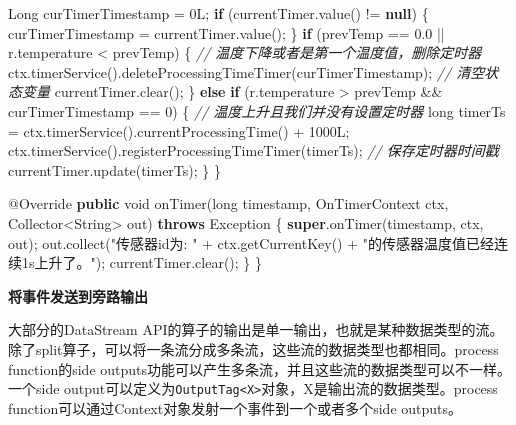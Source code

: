 \documentclass[cn,11pt,chinese]{elegantbook}
\newenvironment{Shaded}{}{}
\newcommand{\AttributeTok}[1]{\textcolor[rgb]{0.49,0.56,0.16}{#1}}
\newcommand{\BuiltInTok}[1]{#1}
\newcommand{\CommentTok}[1]{\textcolor[rgb]{0.38,0.63,0.69}{\textit{#1}}}
\newcommand{\DataTypeTok}[1]{\textcolor[rgb]{0.56,0.13,0.00}{#1}}
\newcommand{\DecValTok}[1]{\textcolor[rgb]{0.25,0.63,0.44}{#1}}
\newcommand{\FloatTok}[1]{\textcolor[rgb]{0.25,0.63,0.44}{#1}}
\newcommand{\FunctionTok}[1]{\textcolor[rgb]{0.02,0.16,0.49}{#1}}
\newcommand{\KeywordTok}[1]{\textcolor[rgb]{0.00,0.44,0.13}{\textbf{#1}}}
\newcommand{\NormalTok}[1]{#1}
\newcommand{\StringTok}[1]{\textcolor[rgb]{0.25,0.44,0.63}{#1}}
\begin{document}
\begin{Shaded}
\begin{Highlighting}[]
        \BuiltInTok{Long}\NormalTok{ curTimerTimestamp = }\DecValTok{0L}\NormalTok{;}
        \KeywordTok{if}\NormalTok{ (currentTimer.}\FunctionTok{value}\NormalTok{() != }\KeywordTok{null}\NormalTok{) \{}
\NormalTok{            curTimerTimestamp = currentTimer.}\FunctionTok{value}\NormalTok{();}
\NormalTok{        \}}
        \KeywordTok{if}\NormalTok{ (prevTemp == }\FloatTok{0.}\DecValTok{0}\NormalTok{ || r.}\FunctionTok{temperature}\NormalTok{ \textless{} prevTemp) \{}
            \CommentTok{// 温度下降或者是第一个温度值，删除定时器}
\NormalTok{            ctx.}\FunctionTok{timerService}\NormalTok{().}\FunctionTok{deleteProcessingTimeTimer}\NormalTok{(curTimerTimestamp);}
            \CommentTok{// 清空状态变量}
\NormalTok{            currentTimer.}\FunctionTok{clear}\NormalTok{();}
\NormalTok{        \} }\KeywordTok{else} \KeywordTok{if}\NormalTok{ (r.}\FunctionTok{temperature}\NormalTok{ \textgreater{} prevTemp \&\& curTimerTimestamp == }\DecValTok{0}\NormalTok{) \{}
            \CommentTok{// 温度上升且我们并没有设置定时器}
            \DataTypeTok{long}\NormalTok{ timerTs = ctx.}\FunctionTok{timerService}\NormalTok{().}\FunctionTok{currentProcessingTime}\NormalTok{() + }\DecValTok{1000L}\NormalTok{;}
\NormalTok{            ctx.}\FunctionTok{timerService}\NormalTok{().}\FunctionTok{registerProcessingTimeTimer}\NormalTok{(timerTs);}
            \CommentTok{// 保存定时器时间戳}
\NormalTok{            currentTimer.}\FunctionTok{update}\NormalTok{(timerTs);}
\NormalTok{        \}}
\NormalTok{    \}}

    \AttributeTok{@Override}
    \KeywordTok{public} \DataTypeTok{void} \FunctionTok{onTimer}\NormalTok{(}\DataTypeTok{long}\NormalTok{ timestamp, OnTimerContext ctx, Collector\textless{}}\BuiltInTok{String}\NormalTok{\textgreater{} out) }\KeywordTok{throws} \BuiltInTok{Exception}\NormalTok{ \{}
        \KeywordTok{super}\NormalTok{.}\FunctionTok{onTimer}\NormalTok{(timestamp, ctx, out);}
\NormalTok{        out.}\FunctionTok{collect}\NormalTok{(}\StringTok{"传感器id为: "}
\NormalTok{                + ctx.}\FunctionTok{getCurrentKey}\NormalTok{()}
\NormalTok{                + }\StringTok{"的传感器温度值已经连续1s上升了。"}\NormalTok{);}
\NormalTok{        currentTimer.}\FunctionTok{clear}\NormalTok{();}
\NormalTok{    \}}
\NormalTok{\}}
\end{Highlighting}
\end{Shaded}

\textbf{将事件发送到旁路输出}

大部分的DataStream
API的算子的输出是单一输出，也就是某种数据类型的流。除了split算子，可以将一条流分成多条流，这些流的数据类型也都相同。process
function的side
outputs功能可以产生多条流，并且这些流的数据类型可以不一样。一个side
output可以定义为\texttt{OutputTag\textless{}X\textgreater{}}对象，X是输出流的数据类型。process
function可以通过Context对象发射一个事件到一个或者多个side outputs。
\end{document}
